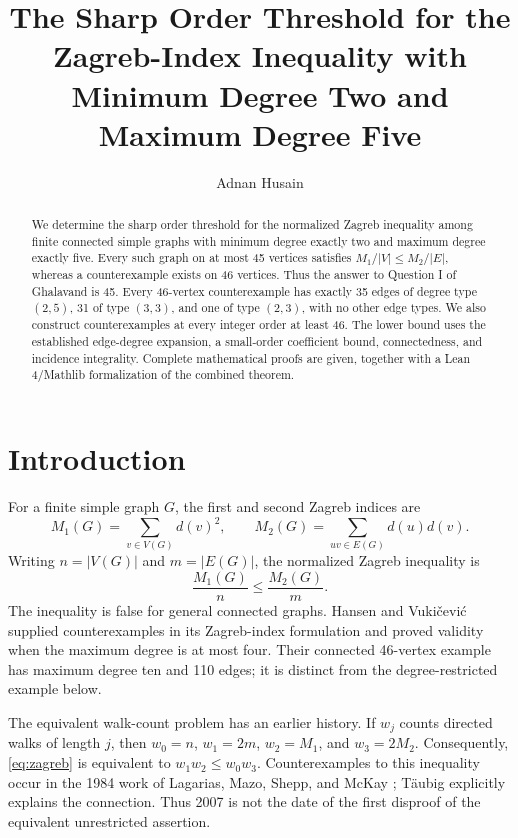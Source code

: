 \documentclass[11pt]{amsart}
\title[Sharp order threshold for the Zagreb inequality]{The Sharp Order Threshold for the Zagreb-Index Inequality with Minimum Degree Two and Maximum Degree Five}
\author{Adnan Husain}
\date{}
\theoremstyle{definition}
\theoremstyle{remark}
\begin{document}
\raggedbottom
\begin{abstract}
We determine the sharp order threshold for the normalized Zagreb inequality among finite connected simple graphs with minimum degree exactly two and maximum degree exactly five. Every such graph on at most 45 vertices satisfies $M_1/|V|\le M_2/|E|$, whereas a counterexample exists on 46 vertices. Thus the answer to Question I of Ghalavand is 45. Every 46-vertex counterexample has exactly 35 edges of degree type $(2,5)$, 31 of type $(3,3)$, and one of type $(2,3)$, with no other edge types. We also construct counterexamples at every integer order at least 46. The lower bound uses the established edge-degree expansion, a small-order coefficient bound, connectedness, and incidence integrality. Complete mathematical proofs are given, together with a Lean 4/Mathlib formalization of the combined theorem.
\end{abstract}
\maketitle

\section{Introduction}
For a finite simple graph $G$, the first and second Zagreb indices are
\[
 M_1(G)=\sum_{v\in V(G)}d(v)^2,
 \qquad M_2(G)=\sum_{uv\in E(G)}d(u)d(v).
\]
Writing $n=|V(G)|$ and $m=|E(G)|$, the normalized Zagreb inequality is
\begin{equation}\label{eq:zagreb}
 \frac{M_1(G)}{n}\le\frac{M_2(G)}{m}.
\end{equation}
The inequality is false for general connected graphs. Hansen and Vuki\v{c}evi\'{c} \cite{HV} supplied counterexamples in its Zagreb-index formulation and proved validity when the maximum degree is at most four. Their connected 46-vertex example has maximum degree ten and 110 edges; it is distinct from the degree-restricted example below.

The equivalent walk-count problem has an earlier history. If $w_j$ counts directed walks of length $j$, then $w_0=n$, $w_1=2m$, $w_2=M_1$, and $w_3=2M_2$. Consequently, \eqref{eq:zagreb} is equivalent to $w_1w_2\le w_0w_3$. Counterexamples to this inequality occur in the 1984 work of Lagarias, Mazo, Shepp, and McKay \cite{LMMS}; T\"aubig \cite{Taubig} explicitly explains the connection. Thus 2007 is not the date of the first disproof of the equivalent unrestricted assertion.
\end{document}

